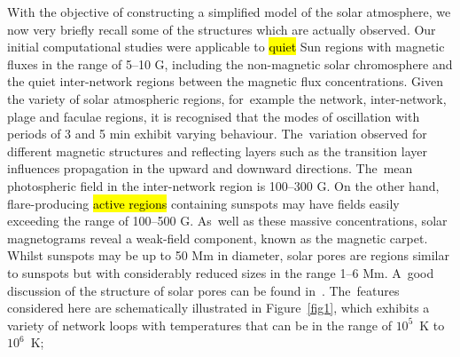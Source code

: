 \documentclass[physics,article,accept,pdftex,moreauthors]{Definitions/mdpi}
\begin{document}
%
With the objective of constructing a simplified model of the solar atmosphere, we now  very briefly recall some of the structures which are  actually observed. Our initial computational studies were applicable to 
 \hl{quiet} 
Sun regions with magnetic fluxes in the range of 5--10 G, including the non-magnetic solar chromosphere and the quiet inter-network regions between the magnetic flux concentrations. Given the variety of solar atmospheric regions, for~example the network, inter-network, plage and faculae regions, it is recognised that the modes of oscillation with periods of 3 and 5 min exhibit varying behaviour. The~variation observed for different magnetic structures and reflecting layers such as the transition layer influences propagation in the upward and downward directions. The~mean photospheric field in the inter-network region is 100--300 G. 
 On the other hand, flare-producing 
 \hl{active regions} %
containing sunspots may have fields easily  exceeding the %
range of 100--500 G. As~well as these massive concentrations, solar magnetograms reveal 
 a weak-field component, known as the magnetic carpet. Whilst sunspots may be up to 50 Mm in diameter, solar pores are regions similar to sunspots but with considerably reduced sizes in the range 1--6 Mm. A~good discussion of the structure of  solar pores can be found in~\cite{Simon1970,Cameron2007}. The~features considered here are  schematically illustrated in Figure~\ref{fig1}, which exhibits a  variety of network loops with temperatures  that  can be in the range of $10^{5}$~K to $10^{6}$~K; 
\end{document}
